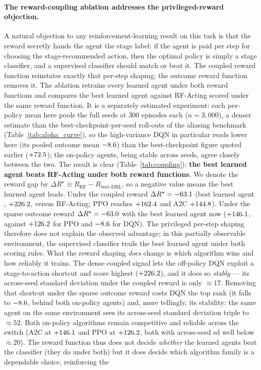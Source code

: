 \paragraph{The reward-coupling ablation addresses the privileged-reward objection.} A natural objection to any reinforcement-learning result on this task is that the reward secretly hands the agent the stage label: if the agent is paid per step for choosing the stage-recommended action, then the optimal policy is simply a stage classifier, and a supervised classifier should match or beat it. The coupled reward function reinstates exactly that per-step shaping; the outcome reward function removes it. The ablation retrains every learned agent under both reward functions and compares the best learned agent against RF-Acting scored under the same reward function. It is a separately estimated experiment: each per-policy mean here pools the full \NumSeeds{} seeds at 300 episodes each ($n = 3{,}000$), a denser estimate than the best-checkpoint-per-seed roll-outs of the aliasing benchmark (Table~\ref{tab:alpha_curve}), so the high-variance DQN in particular reads lower here (its pooled outcome mean $-8.6$) than the best-checkpoint figure quoted earlier ($+72.5$); the on-policy agents, being stable across seeds, agree closely between the two. The result is clear (Table~\ref{tab:coupling}): \textbf{the best learned agent beats RF-Acting under both reward functions}. We denote the reward gap by $\Delta R^{\star} \equiv R_{\mathrm{RF}} - R_{\text{best-DRL}}$, so a negative value means the best learned agent leads. Under the coupled reward $\Delta R^{\star} = -63.1$ (best learned agent \CouplingBestCoupled{}, $+226.2$, versus RF-Acting; PPO reaches $+162.4$ and A2C $+144.8$). Under the sparse outcome reward $\Delta R^{\star} = -63.0$ with the best learned agent now \CouplingBestOutcome{} ($+146.1$, against $+126.2$ for PPO and $-8.6$ for DQN). The privileged per-step shaping therefore does not explain the observed advantage; in this partially observable environment, the supervised classifier trails the best learned agent under both scoring rules. What the reward shaping \emph{does} change is which algorithm wins and how reliably it trains. The dense coupled signal lets the off-policy DQN exploit a stage-to-action shortcut and score highest ($+226.2$), and it does so \emph{stably} --- its across-seed standard deviation under the coupled reward is only $\approx 17$. Removing that shortcut under the sparse outcome reward costs DQN the top rank (it falls to $-8.6$, behind both on-policy agents) and, more tellingly, its stability: the same agent on the same environment sees its across-seed standard deviation triple to $\approx 52$. Both on-policy algorithms remain competitive and reliable across the switch (A2C at $+146.1$ and PPO at $+126.2$, both with across-seed sd well below $\approx 20$). The reward function thus does not decide \emph{whether} the learned agents beat the classifier (they do under both) but it does decide which algorithm family is a dependable choice, reinforcing the 